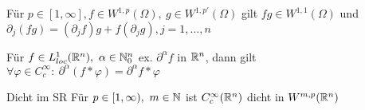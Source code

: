 \begin{bemerkung}
    Für \(p\in [1,\infty], f\in W^{1,p}(\Omega),\ 
    g\in W^{1,p'}(\Omega)\) gilt \(fg\in W^{1,1}(\Omega)\) und
    \(\partial_j(fg)= (\partial_jf)g + f(\partial_jg), j=1,\dots,n\)
\end{bemerkung}

\begin{bemerkung}
    Für \(f\in L_{loc}^1(\mathbb{R}^n),\ \alpha \in \mathbb{N}_0^n\) ex.
    \(\partial^\alpha f\) in \(\mathbb{R}^n\), dann gilt
    \(\forall\varphi\in C_c^\infty:\ \partial^\alpha(f\ast \varphi) = 
    \partial^\alpha f \ast \varphi\) 
\end{bemerkung}

\begin{satz}{Dicht im SR}
    Für \(p\in [1,\infty),\ m\in\mathbb{N}\) ist \(C_c^\infty(\mathbb{R}^n)\) dicht in
    \(W^{m,p}(\mathbb{R}^n)\)
\end{satz}


